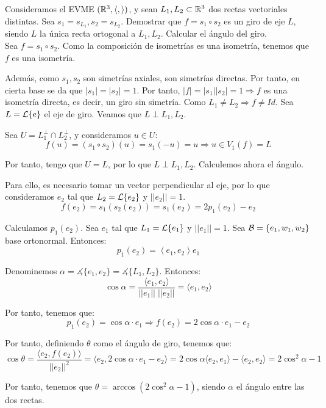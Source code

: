 \begin{ejercicio} Consideramos el EVME $(\mathbb{R}^3, \langle,\rangle)$, y sean $L_1,L_2\subset \mathbb{R}^3$ dos rectas vectoriales distintas. Sea $s_1=s_{L_1},s_2=s_{L_2}$. Demostrar que $f=s_1\circ s_2$ es un giro de eje $L$, siendo $L$ la única recta ortogonal a $L_1,L_2$. Calcular el ángulo del giro.\\

Sea $f=s_1\circ s_2$. Como la composición de isometrías es una isometría, tenemos que $f$ es una isometría.

Además, como $s_1,s_2$ son simetrías axiales, son simetrías directas. Por tanto, en cierta base se da que $|s_1| = |s_2| = 1$. Por tanto, $|f|=|s_1||s_2|=1\Longrightarrow f$ es una isometría directa, es decir, un giro sin simetría. Como $L_1\neq L_2\Longrightarrow f\neq Id$. Sea $L=\mathcal{L}\{e\}$ el eje de giro. Veamos que $L\perp L_1,L_2$.

Sea $U=L_1^\perp \cap L_2^\perp$, y consideramos $u\in U$:
\begin{equation*}
    f(u)=(s_1\circ s_2)(u) = s_1(-u) = u \Longrightarrow u\in V_1(f)=L
\end{equation*}

Por tanto, tengo que $U=L$, por lo que $L\perp L_1, L_2$. Calculemos ahora el ángulo.

Para ello, es necesario tomar un vector perpendicular al eje, por lo que consideramos $e_2$ tal que $L_2=\mathcal{L}\{e_2\}$ y $||e_2||=1$.
\begin{equation*}
    f(e_2) = s_1(s_2(e_2)) = s_1(e_2) = 2p_1(e_2) - e_2
\end{equation*}

Calculamos $p_1(e_2)$. Sea $e_1$ tal que $L_1=\mathcal{L}\{e_1\}$ y $||e_1||=1$. Sea $\mathcal{B}=\{e_1, w_1, w_2\}$ base ortonormal. Entonces:
\begin{equation*}
    p_1(e_2) = \left\langle e_1, e_2\right\rangle e_1
\end{equation*}

Denominemos $\alpha = \measuredangle \{e_1, e_2\} = \measuredangle \{L_1, L_2\}$. Entonces:
\begin{equation*}
    \cos \alpha = \frac{\langle e_1, e_2\rangle}{||e_1||\;||e_2||} = \langle e_1, e_2\rangle
\end{equation*}

Por tanto, tenemos que:
\begin{equation*}
    p_1(e_2) = \cos \alpha \cdot e_1 \Longrightarrow f(e_2) = 2\cos \alpha \cdot e_1 - e_2
\end{equation*}

Por tanto, definiendo $\theta$ como el ángulo de giro, tenemos que:
\begin{equation*}
    \cos \theta = \frac{\langle e_2, f(e_2)\rangle}{||e_2||^2} = \langle e_2, 2\cos \alpha \cdot e_1 - e_2\rangle = 2\cos \alpha \langle e_2, e_1\rangle - \langle e_2, e_2\rangle = 2\cos^2\alpha - 1
\end{equation*}

Por tanto, tenemos que $\theta = \arccos (2\cos^2 \alpha -1)$, siendo $\alpha$ el ángulo entre las dos rectas.

\end{ejercicio}


